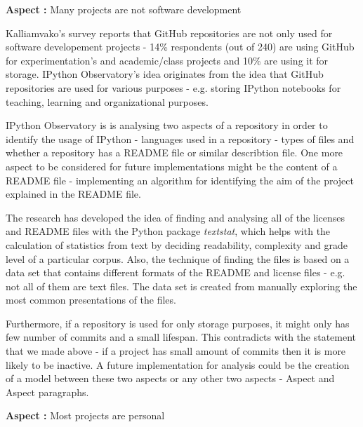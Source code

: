 \vspace{5mm}
\begin{mdframed}
\vspace{1px}
\textbf{Aspect :}  Many projects are not software development
\vspace{1px}
\end{mdframed}
\vspace{2mm}

Kalliamvako's survey\cite{kalliamvakoupromises} reports that GitHub repositories are not only used for software developement projects - 14\% respondents (out of 240) are using GitHub for experimentation's and academic/class projects and 10\% are using it for storage. IPython Observatory's idea originates from the idea that GitHub repositories are used for various purposes - e.g. storing IPython notebooks for teaching, learning and organizational purposes. 

IPython Observatory is is analysing two aspects of a repository in order to identify the usage of IPython - languages used in a repository - types of files and whether a repository has a README file or similar describtion file. One more aspect to be considered for future implementations might be the content of a README file - implementing an algorithm for identifying the aim of the project explained in the README file. 

The research has developed the idea of finding and analysing all of the licenses and README files with the Python package \textit{textstat}\cite{textstat}, which helps with the calculation of statistics from text by deciding readability, complexity and grade level of a particular corpus. Also, the technique of finding the files is based on a data set that contains different formats of the README and license files - e.g. not all of them are text files. The data set is created from manually exploring the most common presentations of the files.

Furthermore, if a repository is used for only storage purposes, it might only has few number of commits and a small lifespan. This contradicts with the statement that we made above - if a project has small amount of commits then it is more likely to be inactive. A future implementation for analysis could be the creation of a model between these two aspects or any other two aspects - Aspect  and Aspect  paragraphs.


\vspace{5mm}
\begin{mdframed}
\vspace{1px}
\textbf{Aspect :}  Most projects are personal
\vspace{1px}
\end{mdframed}
\vspace{2mm}

